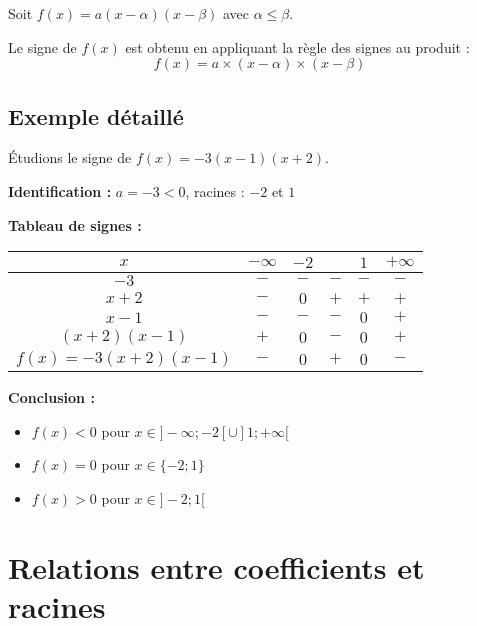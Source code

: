 \documentclass[11pt,a4paper]{article}
\begin{document}
	\begin{propriete}
		Soit $f(x) = a(x - \alpha)(x - \beta)$ avec $\alpha \leq \beta$.
		
		Le signe de $f(x)$ est obtenu en appliquant la règle des signes au produit :
		$$f(x) = a \times (x - \alpha) \times (x - \beta)$$
	\end{propriete}
	
	\subsection{Exemple détaillé}
	
	\begin{exemple}
		Étudions le signe de $f(x) = -3(x - 1)(x + 2)$.
		
		\textbf{Identification :} $a = -3 < 0$, racines : $-2$ et $1$
		
		\textbf{Tableau de signes :}
		
		\begin{center}
			\begin{tabular}{|c|c|c|c|c|c|}
				\hline
				$x$ & $-\infty$ & $-2$ & & $1$ & $+\infty$ \\
				\hline
				$-3$ & $-$ & $-$ & $-$ & $-$ & $-$ \\
				\hline
				$x + 2$ & $-$ & $0$ & $+$ & $+$ & $+$ \\
				\hline
				$x - 1$ & $-$ & $-$ & $-$ & $0$ & $+$ \\
				\hline
				$(x + 2)(x - 1)$ & $+$ & $0$ & $-$ & $0$ & $+$ \\
				\hline
				$f(x) = -3(x + 2)(x - 1)$ & $-$ & $0$ & $+$ & $0$ & $-$ \\
				\hline
			\end{tabular}
		\end{center}
		
		\textbf{Conclusion :}
		\begin{itemize}
			\item $f(x) < 0$ pour $x \in ]-\infty ; -2[ \cup ]1 ; +\infty[$
			\item $f(x) = 0$ pour $x \in \{-2 ; 1\}$
			\item $f(x) > 0$ pour $x \in ]-2 ; 1[$
		\end{itemize}
	\end{exemple}
	
	\section{Relations entre coefficients et racines}
	
\end{document}
